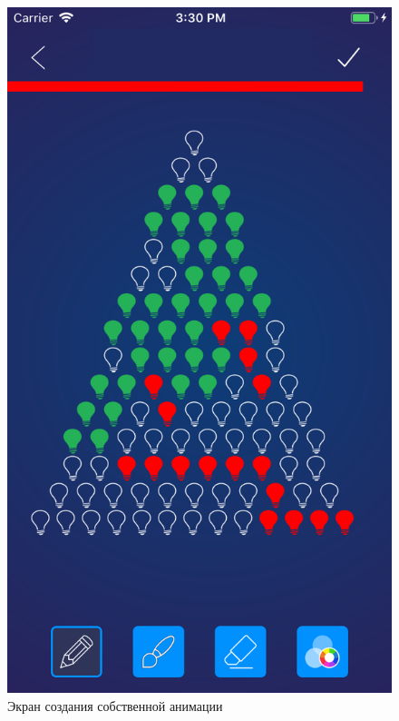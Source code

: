\begin{figure}[H]
\centering
	\includegraphics[scale=0.2]{figures/userGuide/drawingCustom.png}
	\caption{Экран создания собственной анимации}
	\label{fig:develop:userGuide:drawingCustom}
\end{figure}

